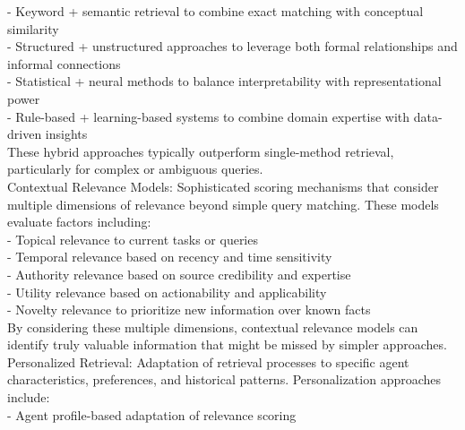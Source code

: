 - Keyword + semantic retrieval to combine exact matching with conceptual similarity\\ \newline
- Structured + unstructured approaches to leverage both formal relationships and informal connections\\ \newline
- Statistical + neural methods to balance interpretability with representational power\\ \newline
- Rule-based + learning-based systems to combine domain expertise with data-driven insights\\ \newline
These hybrid approaches typically outperform single-method retrieval, particularly for complex or ambiguous queries.\\ \newline
Contextual Relevance Models: Sophisticated scoring mechanisms that consider multiple dimensions of relevance beyond simple query matching. These models evaluate factors including:\\ \newline
- Topical relevance to current tasks or queries\\ \newline
- Temporal relevance based on recency and time sensitivity\\ \newline
- Authority relevance based on source credibility and expertise\\ \newline
- Utility relevance based on actionability and applicability\\ \newline
- Novelty relevance to prioritize new information over known facts\\ \newline
By considering these multiple dimensions, contextual relevance models can identify truly valuable information that might be missed by simpler approaches.\\ \newline
Personalized Retrieval: Adaptation of retrieval processes to specific agent characteristics, preferences, and historical patterns. Personalization approaches include:\\ \newline
- Agent profile-based adaptation of relevance scoring\\ \newline
